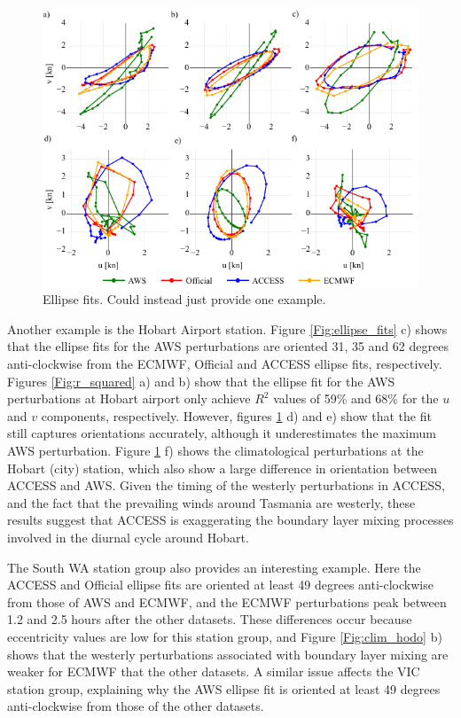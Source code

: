 \documentclass{ametsoc}
\begin{document}
\begin{figure}
\centering
\includegraphics[width=39pc]{ellipse_hodo.pdf}
\caption{Ellipse fits. Could instead just provide one example.}
\label{Fig:ellipse_hodo}
\end{figure}

Another example is the Hobart Airport station. Figure \ref{Fig:ellipse_fits} c) shows that the ellipse fits for the AWS perturbations are oriented 31, 35 and 62 degrees anti-clockwise from the ECMWF, Official and ACCESS ellipse fits, respectively. Figures \ref{Fig:r_squared} a) and b) show that the ellipse fit for the AWS perturbations at Hobart airport only achieve $R^2$ values of 59\% and 68\% for the $u$ and $v$ components, respectively. However, figures \ref{Fig:ellipse_hodo} d) and e) show that the fit still captures orientations accurately, although it underestimates the maximum AWS perturbation. Figure \ref{Fig:ellipse_hodo} f) shows the climatological perturbations at the Hobart (city) station, which also show a large difference in orientation between ACCESS and AWS. Given the timing of the westerly perturbations in ACCESS, and the fact that the prevailing winds around Tasmania are westerly, these results suggest that ACCESS is exaggerating the boundary layer mixing processes involved in the diurnal cycle around Hobart.

The South WA station group also provides an interesting example. Here the ACCESS and Official ellipse fits are oriented at least 49 degrees anti-clockwise from those of AWS and ECMWF, and the ECMWF perturbations peak between 1.2 and 2.5 hours after the other datasets. These differences occur because eccentricity values are low for this station group, and Figure \ref{Fig:clim_hodo} b) shows that the westerly perturbations associated with boundary layer mixing are weaker for ECMWF that the other datasets. A similar issue affects the VIC station group, explaining why the AWS ellipse fit is oriented at least 49 degrees anti-clockwise from those of the other datasets.  
\end{document}

